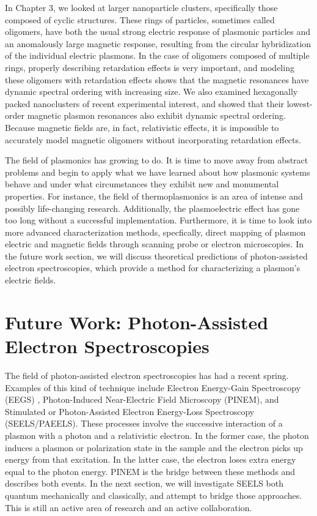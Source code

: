\documentclass [11pt, proquest] {uwthesis}[2016/11/22]
\begin{document}
In Chapter 3, we looked at larger nanoparticle clusters, specifically those composed of cyclic structures. These rings of particles, sometimes called oligomers, have both the usual strong electric response of plasmonic particles and an anomalously large magnetic response, resulting from the circular hybridization of the individual electric plasmons. In the case of oligomers composed of multiple rings, properly describing retardation effects is very important, and modeling these oligomers with retardation effects shows that the magnetic resonances have dynamic spectral ordering with increasing size. We also examined hexagonally packed nanoclusters of recent experimental interest, and showed that their lowest-order magnetic plasmon resonances also exhibit dynamic spectral ordering. Because magnetic fields are, in fact, relativistic effects, it is impossible to accurately model magnetic oligomers without incorporating retardation effects.

The field of plasmonics has growing to do. It is time to move away from abstract problems and begin to apply what we have learned about how plasmonic systems behave and under what circumstances they exhibit new and monumental properties. For instance, the field of thermoplasmonics is an area of intense and possibly life-changing research. Additionally, the plasmoelectric effect has gone too long without a successful implementation. Furthermore, it is time to look into more advanced characterization methods, specfically, direct mapping of plasmon electric and magnetic fields through scanning probe or electron microscopies. In the future work section, we will discuss theoretical predictions of photon-assisted electron spectroscopies, which provide a method for characterizing a plasmon's electric fields.

\section{Future Work: Photon-Assisted Electron Spectroscopies}

The field of photon-assisted electron spectroscopies has had a recent spring. Examples of this kind of technique include Electron Energy-Gain Spectroscopy (EEGS)\cite{EEGS} , Photon-Induced Near-Electric Field Microscopy (PINEM)\cite{PINEM}, and Stimulated or Photon-Assisted Electron Energy-Loss Spectroscopy (SEELS/PAEELS)\cite{EEGS,vanAiken}. These processes involve the successive interaction of a plasmon with a photon and a relativistic electron. In the former case, the photon induces a plasmon or polarization state in the sample and the electron picks up energy from that excitation. In the latter case, the electron loses extra energy equal to the photon energy. PINEM is the bridge between these methods and describes both events. In the next section, we will investigate SEELS both quantum mechanically and classically, and attempt to bridge those approaches.\cite{AbajoRevMod,vanAiken,EEGS} This is still an active area of research and an active collaboration.
\end{document}

